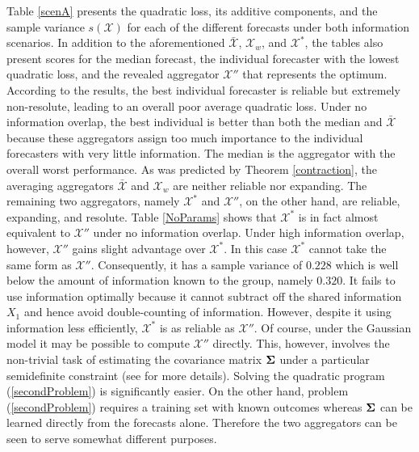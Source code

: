 \documentclass[11pt]{article}
\theoremstyle{definition}
\theoremstyle{definition}
\def\bSigma{{\bf \Sigma}}
\begin{document}
Table \ref{scenA} presents the quadratic loss, its additive components, and the sample variance $s(\boldsymbol{\mathcal{X}} )$ for each of the different forecasts under both information scenarios. In addition to the aforementioned $\bar{\mathcal{X}}$, $\mathcal{X}_w$, and $\mathcal{X}^*$, the tables also present scores for the median forecast,  the individual forecaster with the lowest quadratic loss, and the revealed aggregator $\mathcal{X}''$ that represents the optimum. According to the results, the best individual forecaster is reliable but extremely non-resolute, leading to an overall poor average quadratic loss. Under no information overlap, the best individual is better than both the median and $\bar{\mathcal{X}}$ because these aggregators assign too much importance to the individual forecasters with very little information. The median is the aggregator with the overall worst performance.  As was predicted by Theorem \ref{contraction},  the averaging aggregators $\bar{\mathcal{X}}$ and $\mathcal{X}_w$ are neither reliable nor expanding.  
The remaining two aggregators, namely $\mathcal{X}^*$ and $\mathcal{X}''$, on the other hand, are reliable, expanding, and resolute. Table \ref{NoParams} shows that $\mathcal{X}^*$ is in fact  almost equivalent to $\mathcal{X}''$ under no information overlap. Under high information overlap, however, $\mathcal{X}''$ gains slight advantage over $\mathcal{X}^*$. In this case $\mathcal{X}^*$ cannot take the same form as $\mathcal{X}''$. Consequently, it has a sample variance of $0.228$ which is well below the  amount of information known to the group, namely $0.320$. It fails to use information optimally because it cannot subtract off the shared information $X_1$ and hence avoid double-counting of information. However, despite it using information less efficiently, $\mathcal{X}^*$ is as reliable as $\mathcal{X}''$. Of course, under the Gaussian model it may be possible to compute $\mathcal{X}''$ directly. This, however, involves the non-trivial task of estimating the covariance matrix $\bSigma$ under a particular semidefinite constraint (see \citealt{satopaamodeling2} for more details). Solving the quadratic program (\ref{secondProblem}) is significantly easier. On the other hand, problem (\ref{secondProblem}) requires a training set with known outcomes whereas $\bSigma$ can be learned directly from the forecasts alone. Therefore the two aggregators can be seen to serve somewhat different purposes. 
\end{document}
